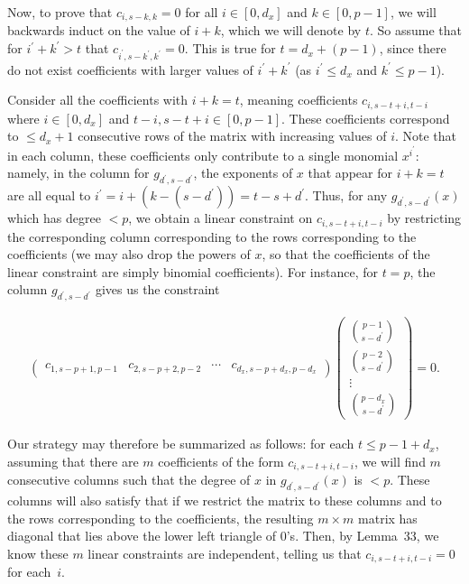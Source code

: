 \documentclass[10pt,a4paper]{article}
\begin{document}
Now, to prove that $c_{i,s-k,k}=0$ for all $i\in[0,d_{x}]$ and $k\in[0,p-1]$, we will backwards induct on the value of $i+k$, which we will denote by $t$. So assume that for $i^{\prime}+k^{\prime}>t$ that $c_{i^{\prime},s-k^{\prime},k^{\prime}}=0$. This is true for $t=d_{x}+(p-1)$, since there do not exist coefficients with larger values of $i^{\prime}+k^{\prime}$ (as $i^{\prime}\leq d_{x}$ and $k^{\prime}\leq p-1$).\par




Consider all the coefficients with $i+k=t$, meaning coefficients $c_{i,s-t+i,t-i}$ where $i\in[0,d_{x}]$ and $t-i,s-t+i\in[0,p-1]$. These coefficients correspond to $\leq d_{x}+1$ consecutive rows of the matrix with increasing values of $i$. Note that in each column, these coefficients only contribute to a single monomial $x^{i^{\prime}}$: namely, in the column for $g_{d^{\prime},s-d^{\prime}}$, the exponents of $x$ that appear for $i+k=t$ are all equal to $i^{\prime}=i+(k-(s-d^{\prime}))=t-s+d^{\prime}$. Thus, for any $g_{d^{\prime},s-d^{\prime}}(x)$ which has degree $<p$, we obtain a linear constraint on $c_{i,s-t+i,t-i}$ by restricting the corresponding column corresponding to the rows corresponding to the coefficients (we may also drop the powers of $x$, so that the coefficients of the linear constraint are simply binomial coefficients). For instance, for $t=p$, the column $g_{d^{\prime},s-d^{\prime}}$ gives us the constraint\par


\[\begin{gathered}
\begin{pmatrix}c_{1,s-p+1,p-1}&c_{2,s-p+2,p-2}&\cdots&c_{d_{x},s-p+d_{x},p-d_{x}}\end{pmatrix}\begin{pmatrix}\binom{p-1}{s-d^{\prime}}\\
\binom{p-2}{s-d^{\prime}}\\
\vdots\\
\binom{p-d_{x}}{s-d^{\prime}}\end{pmatrix}=0.
\end{gathered}\]




Our strategy may therefore be summarized as follows: for each $t\leq p-1+d_{x}$, assuming that there are $m$ coefficients of the form $c_{i,s-t+i,t-i}$, we will find $m$ consecutive columns such that the degree of $x$ in $g_{d^{\prime},s-d^{\prime}}(x)$ is $<p$. These columns will also satisfy that if we restrict the matrix to these columns and to the rows corresponding to the coefficients, the resulting $m\times m$ matrix has diagonal that lies above the lower left triangle of $0$’s. Then, by Lemma 33, we know these $m$ linear constraints are independent, telling us that $c_{i,s-t+i,t-i}=0$ for each $i$.\par
\end{document}
